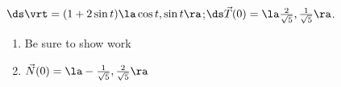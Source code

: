 {$\ds \vrt = (1+2\sin t)\la \cos t,\sin t\ra$;\quad $\ds \vec T(0) = \la \frac2{\sqrt{5}}, \frac1{\sqrt{5}}\ra$.
}
{\begin{enumerate}
	\item Be sure to show work
	\item	$\vec N(0) = \la -\frac1{\sqrt{5}}, \frac2{\sqrt{5}}\ra$
\end{enumerate}
}